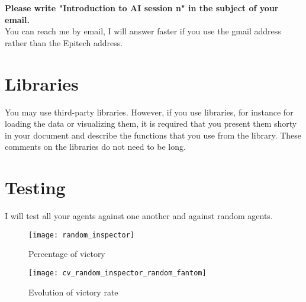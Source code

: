 \documentclass[
10pt, %
a4paper, %
oneside, %
headinclude,footinclude, %
BCOR5mm, %
]{scrartcl}
\begin{document}
\textbf{{Please write "Introduction to AI session n" in the subject of your email.}}
\\

You can reach me by email, I will answer faster if you use the gmail address rather than the Epitech address.

\section{\large\color{Blue}Libraries}

You may use third-party libraries. However, if you use libraries, for instance for loading the data or visualizing them, it is required that you present them shorty in your document and describe the functions that you use from the library. These comments on the libraries do not need to be long.

\section{\large\color{Blue}Testing}

I will test all your agents against one another and against random agents.

\begin{figure}[htpb]
    \centering
    \texttt{[image: random\_inspector]}
    \label{fig:random_inspector}
    \caption{Percentage of victory}
\end{figure}

\begin{figure}[htpb]
    \centering
    \texttt{[image: cv\_random\_inspector\_random\_fantom]}
    \label{fig:cv_random_inspector_random_fantom}
    \caption{Evolution of victory rate}
\end{figure}

\renewcommand{\refname}{\spacedlowsmallcaps{References}} 
\end{document}
